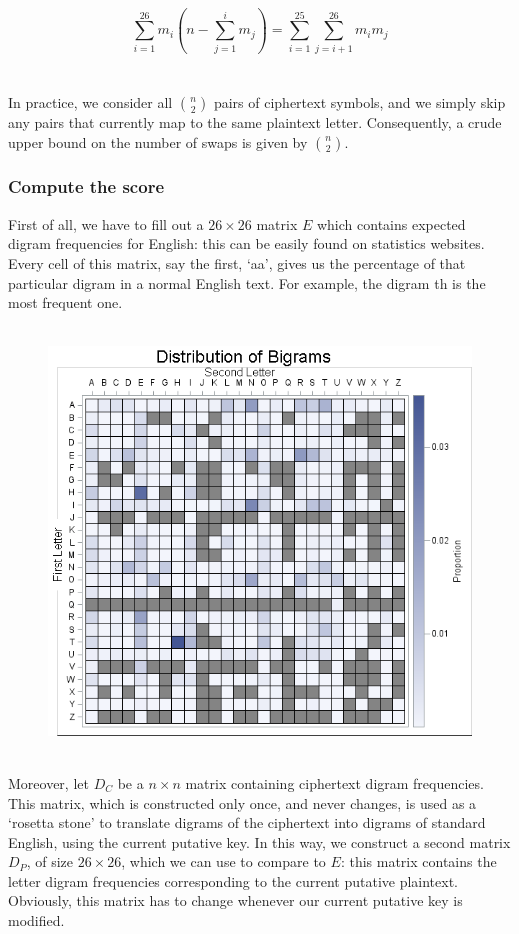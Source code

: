 \documentclass[Lau,binding=0.6cm,oneside]{sapthesis}
\begin{document}
\begin{equation}
\sum_{i=1}^{26} m_i(n-\sum_{j=1}^{i} m_j) = \sum_{i=1}^{25} \sum_{j=i+1}^{26} m_i m_j
\end{equation}
\ \\\\
In practice, we consider all ${n}\choose{2}$ pairs of ciphertext symbols, and we simply skip any pairs that currently map to the same plaintext letter. Consequently, a crude upper bound on the number of swaps is given by ${n}\choose{2}$.\\

\subsubsection{Compute the score}
First of all, we have to fill out a $ 26 \times 26 $ matrix $E$ which contains expected digram frequencies for English: this can be easily found on statistics websites. Every cell of this matrix, say the first, `aa', gives us the percentage of that particular digram in a normal English text. For example, the digram \textsf{th} is the most frequent one.\\\\
\begin{figure}[H]
\includegraphics[scale=0.6]{digramfreqmatrix}
\centering
\caption{}
\centering
\end{figure}
\ \\
Moreover, let $D_C$ be a $n \times n$ matrix containing ciphertext digram frequencies. This matrix, which is constructed only once, and never changes, is used as a `rosetta stone' to translate digrams of the ciphertext into digrams of standard English, using the current putative key. In this way, we construct a second matrix $D_P$, of size $26 \times 26$, which we can use to compare to $E$: this matrix contains the letter digram frequencies corresponding to the current putative plaintext. Obviously, this matrix has to change whenever our current putative key is modified.\\\\
\end{document}
